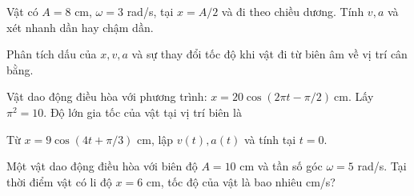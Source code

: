 \begin{ex}
Vật có $A=8$ cm, $\omega=3$ rad/s, tại $x=A/2$ và đi theo chiều dương. Tính $v,a$ và xét nhanh dần hay chậm dần.
\choiceTF

\end{ex}



\begin{ex}
Phân tích dấu của $x,v,a$ và sự thay đổi tốc độ khi vật đi từ biên âm về vị trí cân bằng.
\choiceTF

\end{ex}

\begin{ex}
Vật dao động điều hòa với phương trình: $x=20\cos (2\pi t-\pi /2) \ \mathrm{cm}$. Lấy $\pi^2=10$. Độ lớn gia tốc của vật tại vị trí biên là
\end{ex}


\begin{ex}
Từ $x=9\cos(4t+\pi/3)$ cm, lập $v(t),a(t)$ và tính tại $t=0$.
\choiceTF

\end{ex}

\begin{ex}
Một vật dao động điều hòa với biên độ $A = 10$ cm và tần số góc $\omega = 5$ rad/s. Tại thời điểm vật có li độ $x = 6$ cm, tốc độ của vật là bao nhiêu cm/s?
\end{ex}

